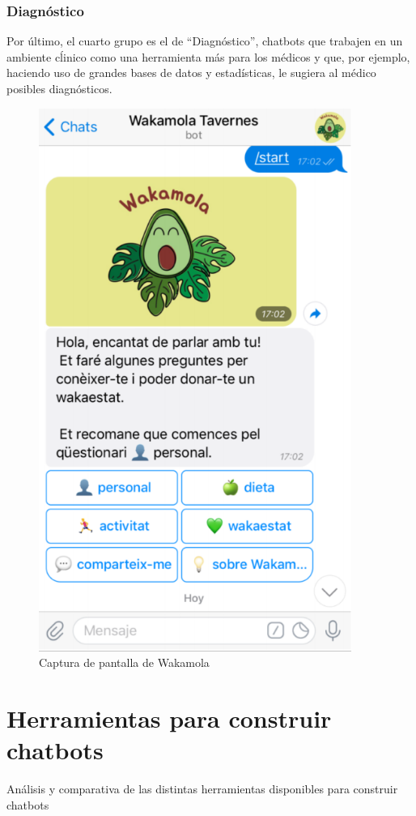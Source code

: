\subsubsection{Diagnóstico}
Por último, el cuarto grupo es el de “Diagnóstico”, chatbots que trabajen en un ambiente cĺinico como una herramienta más para los médicos y que, por ejemplo,
haciendo uso de grandes bases de datos y estadísticas, le sugiera al médico posibles diagnósticos.\\

\begin{figure}[htbp]
\centering
\includegraphics[scale=0.5]{../images/wakamola.png} 
\caption{Captura de pantalla de Wakamola}
\label{fig:x captura wakamola}
\end{figure}

\section{Herramientas para construir chatbots} \label{herramientas construir chatbots}
Análisis y comparativa de las distintas herramientas disponibles para construir chatbots

